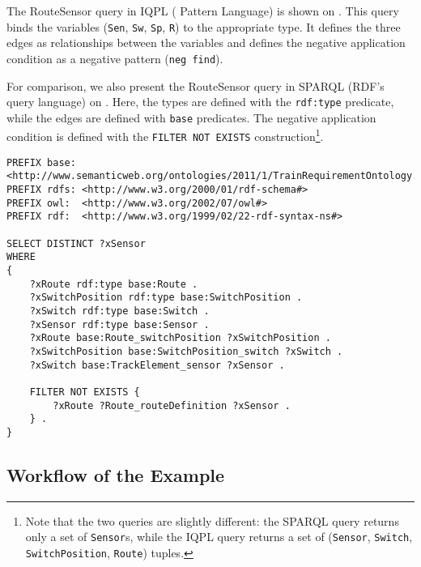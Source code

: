 The RouteSensor query in IQPL (\iq{} Pattern Language) %
is shown on . This query binds the variables (\texttt{Sen}, \texttt{Sw}, \texttt{Sp}, \texttt{R}) to the appropriate type. It defines the three edges as relationships between the variables and defines the negative application condition as a negative pattern (\texttt{neg find}).

For comparison, we also present the RouteSensor query in SPARQL (RDF's query language) on . Here, the types are defined with the \texttt{rdf:type} predicate, while the edges are defined with \texttt{base} predicates. The negative application condition is defined with the \texttt{FILTER NOT EXISTS} construction\footnote{Note that the two queries are slightly different: the SPARQL query returns only a set of \texttt{Sensor}s, while the IQPL query returns a set of (\texttt{Sensor}, \texttt{Switch}, \texttt{SwitchPosition}, \texttt{Route}) tuples.}.


\begin{lstlisting}[caption=The RouteSensor query in SPARQL, label=lst:routesensor-sparql]
PREFIX base: <http://www.semanticweb.org/ontologies/2011/1/TrainRequirementOntology.owl#>
PREFIX rdfs: <http://www.w3.org/2000/01/rdf-schema#>
PREFIX owl:  <http://www.w3.org/2002/07/owl#>
PREFIX rdf:  <http://www.w3.org/1999/02/22-rdf-syntax-ns#>

SELECT DISTINCT ?xSensor
WHERE
{
    ?xRoute rdf:type base:Route .
    ?xSwitchPosition rdf:type base:SwitchPosition .
    ?xSwitch rdf:type base:Switch .
    ?xSensor rdf:type base:Sensor .
    ?xRoute base:Route_switchPosition ?xSwitchPosition .
    ?xSwitchPosition base:SwitchPosition_switch ?xSwitch .
    ?xSwitch base:TrackElement_sensor ?xSensor .

    FILTER NOT EXISTS {
        ?xRoute ?Route_routeDefinition ?xSensor .
    } .
}
\end{lstlisting}



\subsection{Workflow of the Example}
\label{example-workflow}

